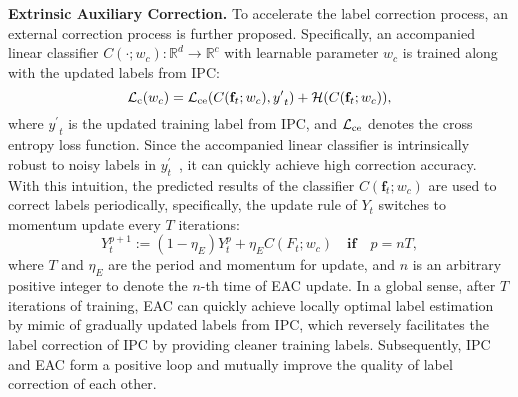 \documentclass[10pt,twocolumn,letterpaper]{article}
\newcommand{\red}[1]{{#1}}
\begin{document}



\textbf{Extrinsic Auxiliary Correction.} To accelerate the label correction process, {an external correction process} is {further} proposed. Specifically, an {accompanied linear} classifier $C(\cdot;w_c) : \mathbb{R}^d \rightarrow \mathbb{R}^c$ with learnable parameter $w_c$ is trained {along} with the updated labels from IPC:
\begin{equation}
   {\mathcal{L}_{\rm c}(w_c)}={\mathcal{L}_{\rm ce}}(C(\mathbf{f}_t;w_c),{{y}^{\prime}}_t)+{\mathcal{H}}(C(\mathbf{f}_t;w_c)),
\label{eq:classifier}
\end{equation}
where ${{y}^{\prime}}_t$ is the updated training label from IPC, {and $\mathcal{L}_{\rm ce}$ denotes the cross entropy loss function.}
Since the {accompanied linear} classifier is intrinsically robust to noisy labels {in $y^{\prime}_t$}~\cite{Reed2015Training}, it can quickly achieve high correction accuracy. {With this intuition}, the predicted results of the classifier $C(\mathbf{f}_t;w_c)$ are used {to correct labels periodically}, specifically, the update rule of $Y_t$ switches to momentum update every $T$ iterations:
\begin{equation}
    Y^{p+1}_t := (1-\eta_{E})Y_t^{p} + \eta_{E} C(F_t;w_c) \quad \textbf{if} \quad p = nT,
\label{eq:eac}
\end{equation}
{where $T$ and $\eta_E$ are the period and momentum for update, and $n$ is an arbitrary positive integer to denote the $n$-th time of EAC update. In a global sense, after $T$ iterations of training, EAC can quickly achieve locally optimal label estimation by mimic of gradually updated labels from IPC, which reversely} facilitates the label correction of IPC {by providing} cleaner training labels. Subsequently, IPC and EAC form a positive loop {and mutually improve the quality of label correction of each other}.
\end{document}
